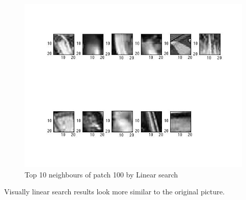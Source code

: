 \documentclass{article}
\begin{document}
\begin{figure}
\centering
\includegraphics[scale=0.5]{lsh/neighours_of_100_by_linear_search.jpg}
\caption{Top 10 neighbours of patch 100 by Linear search}
\label{threadsVsSync}
\end{figure}

Visually linear search results look more similar to the original picture.
\end{document}
